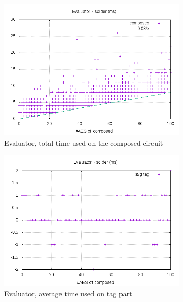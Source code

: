 \documentclass[10pt,a4paper]{article}
\begin{document}
\begin{figure}[h]
    \begin{subfigure}[t]{0.3\textwidth}
        \includegraphics[width=\textwidth]{eval_solder_plots}
        \caption{Evaluator, total time used on the composed circuit}
    \end{subfigure}
    \begin{subfigure}[t]{0.3\textwidth}
        \includegraphics[width=\textwidth]{eval_solder_avg}
        \caption{Evaluator, average time used on tag part}
    \end{subfigure}
    \begin{subfigure}[t]{0.3\textwidth}

\end{subfigure}
\end{figure}
\end{document}
